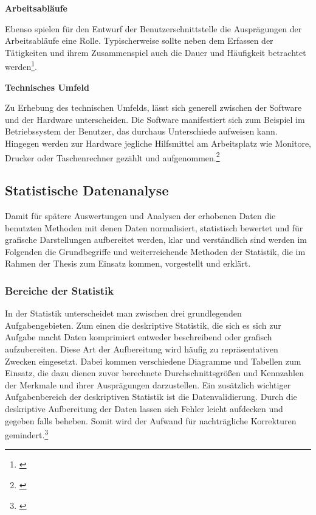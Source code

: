 \textbf{Arbeitsabläufe}

Ebenso spielen für den Entwurf der Benutzerschnittstelle die Ausprägungen der Arbeitsabläufe eine Rolle. Typischerweise sollte neben dem Erfassen der Tätigkeiten und ihrem Zusammenspiel auch die Dauer und Häufigkeit betrachtet werden\footnote{\cite[vgl.][28]{Ecker2016}}.

\textbf{Technisches Umfeld}

Zu Erhebung des technischen Umfelds, lässt sich generell zwischen der Software und der Hardware unterscheiden. Die Software manifestiert sich zum Beispiel im Betriebssystem der Benutzer, das durchaus Unterschiede aufweisen kann. Hingegen werden zur Hardware jegliche Hilfsmittel am Arbeitsplatz wie Monitore, Drucker oder Taschenrechner gezählt und aufgenommen.\footnote{\cite[vgl.][28]{Ecker2016}}


\subsection{Statistische Datenanalyse}
Damit für spätere Auswertungen und Analysen der erhobenen Daten die benutzten Methoden mit denen Daten normalisiert, statistisch bewertet und für grafische Darstellungen aufbereitet werden, klar und verständlich sind werden im Folgenden die Grundbegriffe und weiterreichende Methoden der Statistik, die im Rahmen der Thesis zum Einsatz kommen, vorgestellt und erklärt.


\subsubsection{Bereiche der Statistik}
In der Statistik unterscheidet man zwischen drei grundlegenden Aufgabengebieten. Zum einen die deskriptive Statistik, die sich es sich zur Aufgabe macht Daten komprimiert entweder beschreibend oder grafisch aufzubereiten. Diese Art der Aufbereitung wird häufig zu repräsentativen Zwecken eingesetzt. Dabei kommen verschiedene Diagramme und Tabellen zum Einsatz, die dazu dienen zuvor berechnete Durchschnittsgrößen und Kennzahlen der Merkmale und ihrer Ausprägungen darzustellen. Ein zusätzlich wichtiger Aufgabenbereich der deskriptiven Statistik ist die Datenvalidierung. Durch die deskriptive Aufbereitung der Daten lassen sich Fehler leicht aufdecken und gegeben falls beheben. Somit wird der Aufwand für nachträgliche Korrekturen gemindert.\footnote{\cite[vgl.][10\psq]{Statistik2016}}

